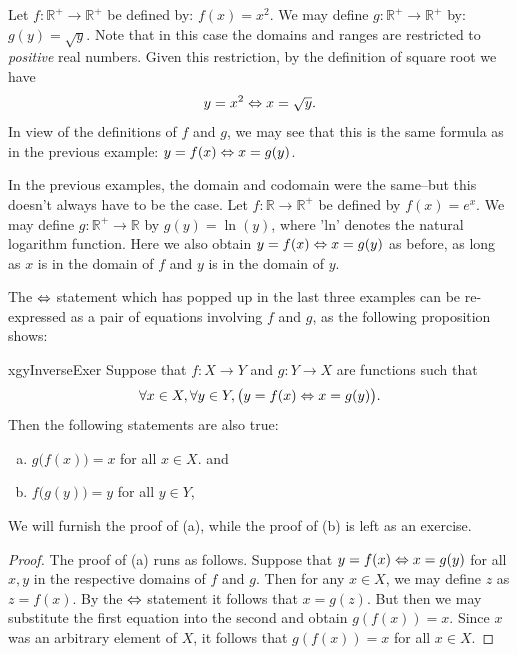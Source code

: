 \begin{example}{}
Let $f \colon \mathbb{R}^+ \rightarrow \mathbb{R}^+$ be defined by: $f(x) = x^2$. We may define $g \colon \mathbb{R}^+ \to \mathbb{R}^+$ by: $g(y) = \sqrt{y}$.  Note that in this case the domains and ranges are restricted to \emph{positive} real numbers. Given this restriction,  by the definition of square root we have
\[ y = x^2 \Leftrightarrow  x = \sqrt{y}. \] 
In view of the definitions of $f$ and $g$, we may see that this is the same formula as in the previous example: $ y = f(x) \Leftrightarrow  x = g(y)$.
\end{example}

\begin{example}{}
In the previous examples, the domain and codomain were the same--but this doesn't always have to be the case. Let $f \colon \mathbb{R} \rightarrow \mathbb{R}^+$ be defined by $f(x) = e^x$. We may define $g \colon \mathbb{R}^+ \to \mathbb{R}$ by $g(y) = \ln (y)$, where 'ln' denotes the natural logarithm function.  Here we also obtain $ y = f(x) \Leftrightarrow  x = g(y)$ as before, as long as $x$ is in the domain of $f$ and $y$ is in the domain of $y$.
\end{example}

The $\Leftrightarrow$ statement which has popped up in the last three examples can be re-expressed as a pair of equations involving $f$ and $g$, as the following proposition shows:

 \begin{prop}{xgyInverseExer}
 Suppose  that $f \colon X \to Y$
 and $g \colon Y \to X$ are functions such that
 \[ \forall x \in X, \forall y \in Y, \bigl(y = f(x) \Leftrightarrow x = g(y) \bigr). \]
Then the following statements are also true:
  \begin{enumerate}[(a)]
 \item  \label{x=g(y)->InverseExer-g(f(x))}
 $g \bigl( f(x) \bigr) = x$  for all $x \in X$.
 and
 \item  \label{x=g(y)->InverseExer-f(g(y))}
 $f \bigl( g(y) \bigr) = y$ for all $y \in Y$,

 \end{enumerate}
\end{prop}

We will furnish the proof of (a), while the proof of (b) is left as an exercise.

 \begin{proof}
The proof of (a) runs as follows. Suppose that $y = f(x) \Leftrightarrow x = g(y) $ for all $x,y$ in the respective domains of $f$ and $g$. 
Then for any $x \in X$, we may define $z$ as $z = f(x)$. By the $\Leftrightarrow$ statement it follows that   $x = g(z)$. But then we may substitute the first equation into the second and obtain $ g(f(x)) = x$.  Since $x$ was an arbitrary element of $X$, it follows that  $ g(f(x)) = x$ for all $x \in X$.
\end{proof}

